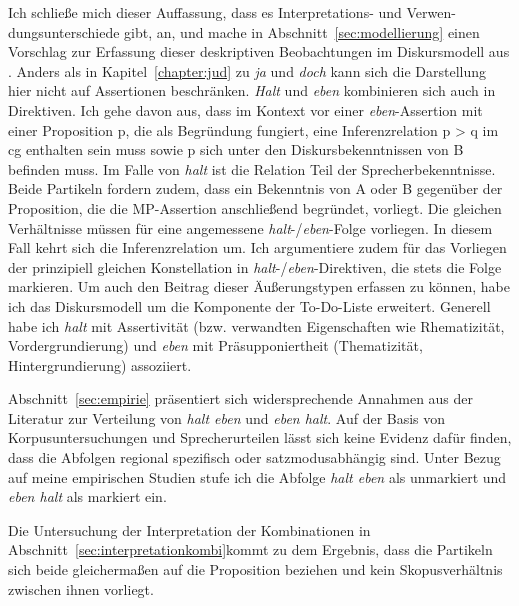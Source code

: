 Ich schließe mich dieser Auffassung, dass es Interpretations- und Verwen-\linebreak dungsunterschiede gibt, an, und mache in Abschnitt~\ref{sec:modellierung} einen Vorschlag zur Erfassung dieser deskriptiven Beobachtungen im Diskursmodell aus \citet{Farkas2010}. Anders als in Kapitel~\ref{chapter:jud} zu \textit{ja} und \textit{doch} kann sich die Darstellung hier nicht auf Assertionen beschränken. \textit{Halt} und \textit{eben} kombinieren sich auch in  Direktiven. Ich gehe davon aus, dass im Kontext vor einer \textit{eben}-Assertion mit einer Proposition p, die als Begründung fungiert, eine Inferenzrelation  p > q im cg enthalten sein muss sowie p sich unter den Diskursbekenntnissen von B befinden muss. Im Falle von \textit{halt} ist die Relation Teil der Sprecherbekenntnisse. Beide Partikeln fordern zudem, dass ein Bekenntnis von A oder B gegenüber der Proposition, die die MP-Assertion anschließend begründet, vorliegt. Die gleichen Verhältnisse müssen für eine angemessene \textit{halt}-/\textit{eben}-Folge vorliegen. In diesem Fall kehrt sich die Inferenzrelation um. Ich argumentiere zudem für das Vorliegen der prinzipiell gleichen Konstellation in \textit{halt}-/\textit{eben}-Direktiven, die stets die Folge markieren. Um auch den Beitrag dieser Äußerungstypen erfassen zu können, habe ich das Diskursmodell um die Komponente der To-Do-Liste  erweitert. Generell habe ich \textit{halt} mit Assertivität  (bzw. verwandten Eigenschaften wie  Rhematizität,  Vordergrundierung) und  \textit{eben} mit  Präsupponiertheit (Thematizität, Hintergrundierung)  assoziiert.

Abschnitt~\ref{sec:empirie} präsentiert sich widersprechende Annahmen aus der Literatur zur Verteilung von \textit{halt eben} und \textit{eben halt}. Auf der Basis von Korpusuntersuchungen und Sprecherurteilen lässt sich keine Evidenz dafür finden, dass die Abfolgen regional spezifisch oder satzmodusabhängig sind. Unter Bezug auf meine empirischen Studien stufe ich die Abfolge \textit{halt eben} als unmarkiert und \textit{eben halt} als markiert ein. 

Die Untersuchung der Interpretation der Kombinationen in Abschnitt~\ref{sec:interpretationkombi}\linebreak kommt zu dem Ergebnis, dass die Partikeln sich beide gleichermaßen auf die Proposition beziehen und kein Skopusverhältnis  zwischen ihnen vorliegt. 

